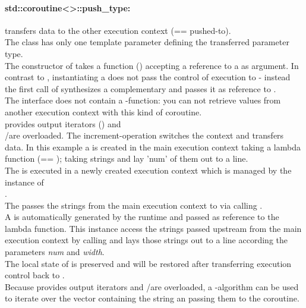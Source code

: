 \paragraph*{std::coroutine<>::push\_type:}
transfers data to the other execution context (== pushed-to).\\
The class has only one template parameter defining the transferred parameter
type.\\
The constructor of \pushcoro takes a function (\corofunction) accepting a
reference to a \pullcoro as argument. In contrast to \pullcoro, instantiating a
\pushcoro does not pass the control of execution to \corofunction{ }- instead
the first call of \pushcoroop synthesizes a complementary \pullcoro and passes
it as reference to \corofunction.\\
\newline
The interface does not contain a \get-function: you can not retrieve
values from another execution context with this kind of coroutine.\\
\newline
\pushcoro provides output iterators (\pushcoroiterator) and\\
\bgin/\ed are overloaded. The increment-operation switches the context and
transfers data.
In this example a \pushcoro is created in the main execution context taking a
lambda function (== \corofunction); taking strings and lay 'num' of them out to a
line.\\
The \corofunction is executed in a newly created execution context which is
managed by the instance of\\
\pushcoro.\\
The \pushcoro passes the strings from the main execution context to
\corofunction via calling \pushcoroop.\\
A \pullcoro is automatically generated by the runtime and passed as reference
to the lambda function. This \pullcoro instance access the strings passed
upstream from the main execution context by calling \pullcoroget and lays those
strings out to a line according the parameters \textit{num} and \textit{width}.\\
The local state of \corofunction is preserved and will be restored after
transferring execution control back to \corofunction.\\
Because \pushcoro provides output iterators and \bgin/\ed are overloaded, a
-algorithm can be used to iterate over the vector containing the
string an passing them to the coroutine.

